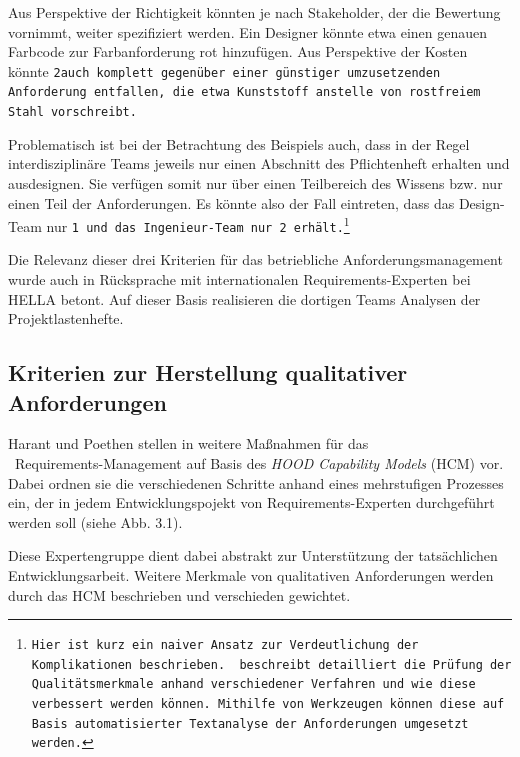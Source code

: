 \documentclass[12pt]{report}
\begin{document}
Aus Perspektive der Richtigkeit könnten je nach Stakeholder, der die Bewertung vornimmt, weiter spezifiziert werden. Ein Designer könnte etwa einen genauen Farbcode zur Farbanforderung \glqq rot\grqq{} hinzufügen. Aus Perspektive der Kosten könnte \tt 2\rm auch komplett gegenüber einer günstiger umzusetzenden Anforderung entfallen, die etwa \glqq Kunststoff\grqq{} anstelle von \glqq rostfreiem Stahl\grqq{} vorschreibt.

Problematisch ist bei der Betrachtung des Beispiels auch, dass in der Regel interdisziplinäre Teams jeweils nur einen Abschnitt des Pflichtenheft erhalten und ausdesignen. Sie verfügen somit nur über einen Teilbereich des Wissens bzw. nur einen Teil der Anforderungen. Es könnte also der Fall eintreten, dass das Design-Team nur \tt 1 \rm und das Ingenieur-Team nur \tt 2 \rm erhält.\footnote{Hier ist kurz ein naiver Ansatz zur Verdeutlichung der Komplikationen beschrieben. \cite{zg02} beschreibt detailliert die Prüfung der Qualitätsmerkmale anhand verschiedener Verfahren und wie diese verbessert werden können. Mithilfe von Werkzeugen können diese auf Basis automatisierter Textanalyse der Anforderungen umgesetzt werden.}

Die Relevanz dieser drei Kriterien für das betriebliche Anforderungsmanagement wurde auch in Rücksprache mit internationalen Requirements-Experten bei HELLA betont. Auf dieser Basis realisieren die dortigen Teams Analysen der Projektlastenhefte. 

\subsection{Kriterien zur Herstellung qualitativer Anforderungen}
Harant und Poethen stellen in \cite{hp12} weitere Maßnahmen für das \\\ Requirements-Management auf Basis des \textit{HOOD Capability Models} (HCM) vor. Dabei ordnen sie die verschiedenen Schritte anhand eines mehrstufigen Prozesses ein, der in jedem Entwicklungspojekt von Requirements-Experten durchgeführt werden soll (siehe Abb. 3.1). 

Diese Expertengruppe dient dabei abstrakt zur Unterstützung der tatsächlichen Entwicklungsarbeit. Weitere Merkmale von qualitativen Anforderungen werden durch das HCM beschrieben und verschieden gewichtet. 
\end{document}
